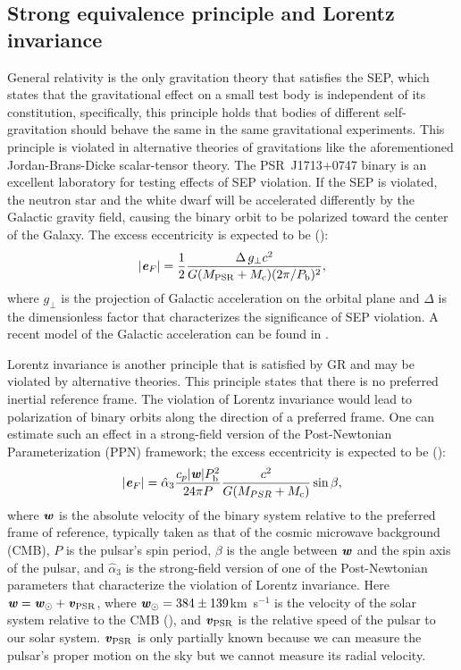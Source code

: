 \subsection{Strong equivalence principle and Lorentz invariance}
\label{sec:sep}
General relativity is the only gravitation theory that satisfies
the SEP, which states that the gravitational
effect on a small test body is independent of its constitution, specifically,
this principle holds that bodies of different self-gravitation should behave the same in
the same gravitational experiments. This principle is violated in alternative
theories of gravitations like the aforementioned Jordan-Brans-Dicke
scalar-tensor theory. The PSR~J1713+0747 binary is an excellent laboratory for testing 
effects of SEP violation. If the SEP is violated, the neutron star and the white
dwarf will be accelerated differently by the Galactic gravity field, causing
the binary orbit to be polarized toward the center of the Galaxy. The excess 
eccentricity is expected to be (\citealt{ds91}):
\begin{equation}
|\textbf{\textit{e}}_F| = \frac{1}{2}\frac{\Delta\, g_{\bot}
  c^2}{G(M_{\rm PSR}+M_{\rm
c})(2\pi/P_{\rm b})^2},
\end{equation}
where $g_{\bot}$ is the projection of Galactic acceleration on the orbital plane 
and $\Delta$ is the dimensionless factor that characterizes the significance 
of SEP violation. A recent model of the Galactic acceleration can be found in
\citet{hf04a}.

Lorentz invariance is another principle that is satisfied by GR and may
be violated by alternative theories. This principle
states that there is no preferred inertial reference frame. The violation of
Lorentz invariance would lead to polarization of binary orbits along the
direction of a preferred frame.
One can estimate such an effect in a strong-field version of the Post-Newtonian Parameterization
(PPN) framework\cite{de92}; the excess eccentricity is expected to be (\citealt{bd96}):
\begin{equation}
|\textbf{\textit{e}}_F| = \hat{\alpha}_3 \frac{c_p|\textbf{\textit{w}}|P_{\rm b}^2}{24\pi P}
\frac{c^2}{G (M_{PSR}+M_{\rm c})}\sin \beta,
\end{equation}
where $\textbf{\textit{w}}$ is the absolute velocity of the binary system
relative to the preferred frame of reference, typically taken as that of the cosmic microwave background (CMB), $P$ is the pulsar's spin period, $\beta$ is the
angle between $\textbf{\textit{w}}$ and the spin axis of the pulsar, and
$\hat{\alpha}_3$ is the strong-field version of one of the Post-Newtonian parameters that characterize the violation of Lorentz invariance. 
Here $\textbf{\textit{w}} = \textbf{\textit{w}}_{\odot} + \textbf{\textit{v}}_{\rm PSR}$, where
$\textbf{\textit{w}}_{\odot}=384\pm139$km~s$^{-1}$ is the velocity of
the solar system relative to the CMB (\citealt{aaa+13}),
and $\textbf{\textit{v}}_{\rm PSR}$ is the relative speed of the pulsar to our solar system. $\textbf{\textit{v}}_{\rm PSR}$ is only partially known because we can measure the pulsar's
proper motion on the sky but we cannot measure its radial velocity.

